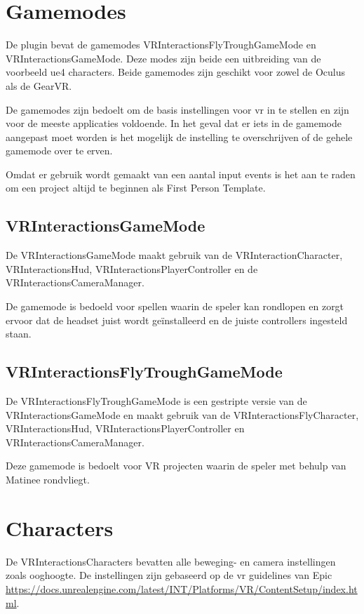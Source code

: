 \section{Gamemodes}
De plugin bevat de gamemodes VRInteractionsFlyTroughGameMode en VRInteractionsGameMode. Deze modes zijn beide een uitbreiding van de voorbeeld \gls{ue4} characters. Beide gamemodes zijn geschikt voor zowel de Oculus als de GearVR. 

De gamemodes zijn bedoelt om de basis instellingen voor \gls{vr} in te stellen en zijn voor de meeste applicaties voldoende. In het geval dat er iets in de gamemode aangepast moet worden is het mogelijk de instelling te overschrijven of de gehele gamemode over te erven.

Omdat er gebruik wordt gemaakt van een aantal input events is het aan te raden om een project altijd te beginnen als First Person Template.

\subsection{VRInteractionsGameMode}
De VRInteractionsGameMode maakt gebruik van de VRInteractionCharacter, VRInteractionsHud, VRInteractionsPlayerController en de VRInteractionsCameraManager. 

De gamemode is bedoeld voor spellen waarin de speler kan rondlopen en zorgt ervoor dat de headset juist wordt geïnstalleerd en de juiste controllers ingesteld staan.

\subsection{VRInteractionsFlyTroughGameMode}
De VRInteractionsFlyTroughGameMode is een gestripte versie van de VRInteractionsGameMode en maakt gebruik van de VRInteractionsFlyCharacter, VRInteractionsHud, VRInteractionsPlayerController en VRInteractionsCameraManager.

Deze gamemode is bedoelt voor VR projecten waarin de speler met behulp van Matinee rondvliegt.

\section{Characters}
De VRInteractionsCharacters bevatten alle beweging- en camera instellingen zoals ooghoogte. De instellingen zijn gebaseerd op de \gls{vr} guidelines van Epic \href{https://docs.unrealengine.com/latest/INT/Platforms/VR/ContentSetup/index.html#vrcharactersettings}{https://docs.unrealengine.com/latest/INT/Platforms/VR/ContentSetup/index.html}.


